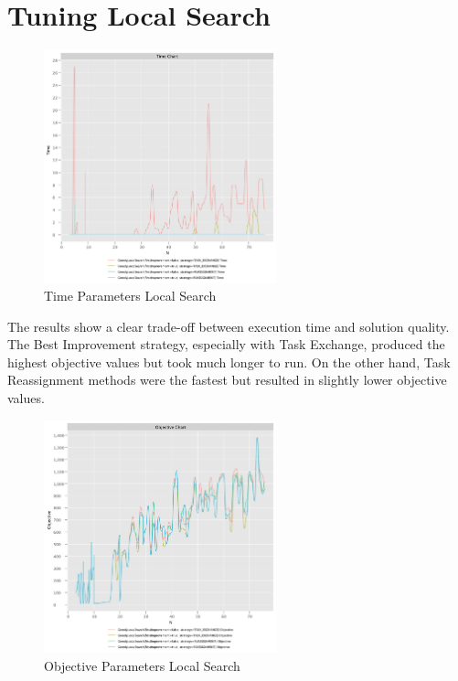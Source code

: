 \documentclass{article}
\begin{document}
\section{Tuning Local Search}

\begin{figure}[!h]
    \centering
    \includegraphics[width=0.6\textwidth]{./documentation/assets/new.localSearchParams.timeChart.pdf}
    \caption{Time Parameters Local Search}
    \label{fig:local_time}
\end{figure}\FloatBarrier

The results show a clear trade-off between execution time and solution quality. The Best Improvement strategy, especially with Task Exchange, produced the highest objective values but took much longer to run. On the other hand, Task Reassignment methods were the fastest but resulted in slightly lower objective values.

\begin{figure}[!h]
    \centering
    \includegraphics[width=0.6\textwidth]{./documentation/assets/new.localSearchParams.objectiveChart.pdf}
    \caption{Objective Parameters Local Search}
    \label{fig:local_objective}
\end{figure}\FloatBarrier
\end{document}
